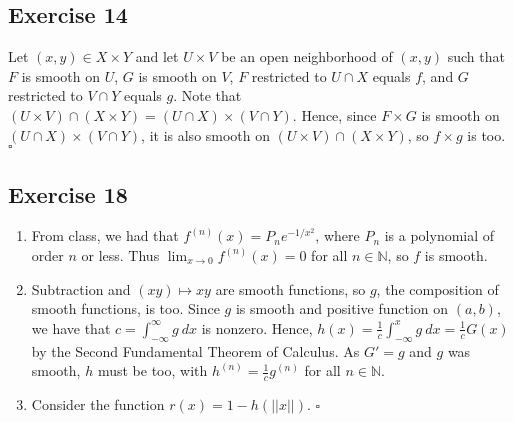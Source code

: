 \documentclass{article}
\begin{document}
\subsection*{Exercise 14}
Let $(x,y) \in X \times Y$ and let $U \times V$ be an open neighborhood of $(x,y)$ such that
$F$ is smooth on $U$, $G$ is smooth on $V$, $F$ restricted to $U \cap X$ equals $f$, and
$G$ restricted to $V \cap Y$ equals $g$. Note that
$(U \times V)\cap(X\times Y)=(U \cap X) \times (V \cap Y)$. Hence, since
$F\times G$ is smooth on
$(U \cap X) \times (V \cap Y)$, it is also smooth on 
$(U \times V)\cap(X\times Y)$, so $f \times g$ is too.
\hfill $\square$

\subsection*{Exercise 18}
\begin{enumerate}[label=\textbf{\alph*}]
\item{
	From class, we had that $f^{(n)}(x) = P_n e^{-1/{x^2}}$, where $P_n$ is a polynomial of order
	$n$ or less. Thus $\lim_{x \to 0} f^{(n)}(x) = 0$ for all $n \in \mathbb{N}$, so $f$ is smooth.
}
\item{
	Subtraction and $(xy) \mapsto xy$ are smooth functions, so $g$, the composition of smooth functions,
	 is too. Since $g$ is smooth and positive function on $(a,b)$,
	we have that $c=\int_{-\infty}^{\infty}g\ dx$ is nonzero. Hence,
	$h(x) =\frac{1}{c}\int_{-\infty}^{x}g\ dx = \frac{1}{c}G(x)$ by the Second Fundamental Theorem of Calculus.
	As $G' = g$ and $g$ was smooth, $h$ must be too, with $h^{(n)} = \frac{1}{c}g^{(n)}$ for all $n \in \mathbb{N}$.
}
\item{
	Consider the function $r(x)=1-h(\vert\vert x\vert\vert)$.
}
\hfill $\square$
\end{enumerate}
\end{document}
